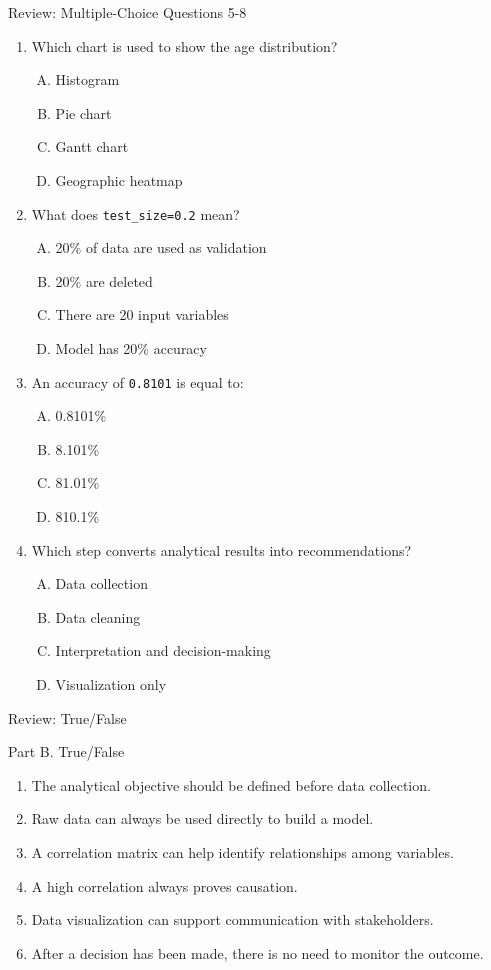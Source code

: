 \documentclass[aspectratio=169,11pt]{beamer}
\begin{document}
\begin{frame}{Review: Multiple-Choice Questions 5-8}
\begin{enumerate}\scriptsize\setcounter{enumi}{4}
  \item Which chart is used to show the age distribution?
  \begin{enumerate}[A.]\scriptsize
    \item Histogram \item Pie chart \item Gantt chart \item Geographic heatmap
  \end{enumerate}
  \item What does \texttt{test\_size=0.2} mean?
  \begin{enumerate}[A.]\scriptsize
    \item 20\% of data are used as validation \item 20\% are deleted \item There are 20 input variables \item Model has 20\% accuracy
  \end{enumerate}
  \item An accuracy of \texttt{0.8101} is equal to:
  \begin{enumerate}[A.]\scriptsize
    \item 0.8101\% \item 8.101\% \item 81.01\% \item 810.1\%
  \end{enumerate}
  \item Which step converts analytical results into recommendations?
  \begin{enumerate}[A.]\scriptsize
    \item Data collection \item Data cleaning \item Interpretation and decision-making \item Visualization only
  \end{enumerate}
\end{enumerate}
\end{frame}

\begin{frame}{Review: True/False}
\begin{block}{Part B. True/False}
\begin{enumerate}
  \item The analytical objective should be defined before data collection.
  \item Raw data can always be used directly to build a model.
  \item A correlation matrix can help identify relationships among variables.
  \item A high correlation always proves causation.
  \item Data visualization can support communication with stakeholders.
  \item After a decision has been made, there is no need to monitor the outcome.
\end{enumerate}
\end{block}
\end{frame}
\end{document}
